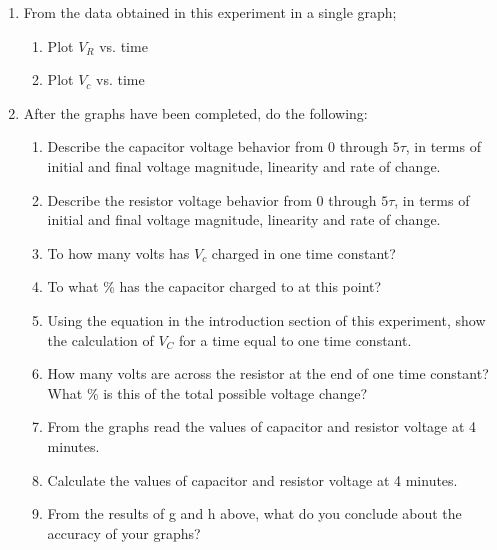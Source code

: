 \documentclass[a4paper]{article}
\begin{document}
\begin{enumerate}
    \item From the data obtained in this experiment in a single graph; \\
    \begin{enumerate}
        \item Plot $V_{R}$ vs. time \\
        \item Plot $V_{c}$ vs. time \\
    \end{enumerate}
    \item After the graphs have been completed, do the following: \\
    \begin{enumerate}
        \item Describe the capacitor voltage behavior from 0 through $5\tau$, in terms of initial and final voltage magnitude, linearity and rate of change. \\
        \item Describe the resistor voltage behavior from 0 through $5\tau$, in terms of initial and final voltage magnitude, linearity and rate of change. \\
        \item To how many volts has $V_{c}$ charged in one time constant? \\
        \item To what \% has the capacitor charged to at this point? \\
        \item Using the equation in the introduction section of this experiment, show the calculation of $V_{C}$ for a time equal to one time constant. \\
        \item How many volts are across the resistor at the end of one time constant? What \% is this of the total possible voltage change? \\
        \item From the graphs read the values of capacitor and resistor voltage at 4 minutes. \\
        \item Calculate the values of capacitor and resistor voltage at 4 minutes. \\
        \item From the results of g and h above, what do you conclude about the accuracy of your graphs? \\
    \end{enumerate}
\end{enumerate}
\end{document}
